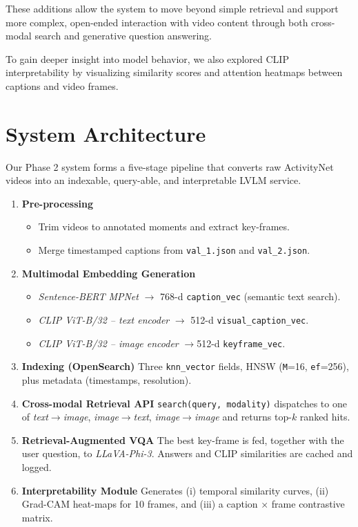 \documentclass[runningheads]{llncs}
\begin{document}
These additions allow the system to move beyond simple retrieval and support more complex, open-ended interaction with video content through both cross-modal search and generative question answering.

To gain deeper insight into model behavior, we also explored CLIP interpretability by visualizing similarity scores and attention heatmaps between captions and video frames.


\vspace{2\baselineskip plus 0.5\baselineskip minus 0.5\baselineskip} %

\pagebreak

\section{System Architecture}
Our Phase 2 system forms a five-stage pipeline that converts raw ActivityNet videos into an indexable,
query-able, and interpretable LVLM service.

\begin{enumerate}
  \item \textbf{Pre-processing}  
        \begin{itemize}
        \item Trim videos to annotated moments and extract key-frames.
        \item Merge timestamped captions from \texttt{val\_1.json} and \texttt{val\_2.json}.
        \end{itemize}
  \item \textbf{Multimodal Embedding Generation}  
        \begin{itemize}
        \item \emph{Sentence-BERT MPNet} $\!\to$ 768-d \texttt{caption\_vec} (semantic text search).  
        \item \emph{CLIP ViT-B/32 -- text encoder} $\!\to$ 512-d \texttt{visual\_caption\_vec}.  
        \item \emph{CLIP ViT-B/32 -- image encoder} $\!\to$512-d \texttt{keyframe\_vec}.
        \end{itemize}
  \item \textbf{Indexing (OpenSearch)}  
        Three \texttt{knn\_vector} fields, HNSW (\texttt{M}=16, \texttt{ef}=256), plus metadata (timestamps, resolution).
  \item \textbf{Cross-modal Retrieval API}  
        \texttt{search(query, modality)} dispatches to one of  
        \textit{text$\!\to$image}, \textit{image$\!\to$text}, \textit{image$\!\to$image} and returns top-\(k\) ranked hits.
  \item \textbf{Retrieval-Augmented VQA}  
        The best key-frame is fed, together with the user question, to \emph{LLaVA-Phi-3}.  
        Answers and CLIP similarities are cached and logged.
  \item \textbf{Interpretability Module}  
        Generates (i) temporal similarity curves, (ii) Grad-CAM heat-maps for 10 frames, and (iii) a caption × frame
        contrastive matrix.
\end{enumerate}
\pagebreak[3]
\end{document}
